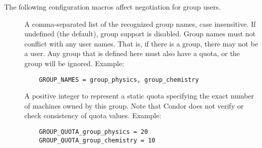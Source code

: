 The following configuration macros affect negotiation for group users.
\begin{description}

\item[] \label{param:GroupNames}
  A comma-separated list of the recognized group names, case insensitive.
  If undefined (the default), group support is disabled.
  Group names must not conflict with any user names.
  That is, if there is a \verb@physics@ group, there may not be
  a \verb@physics@ user.
  Any group that is defined here must also have a quota,
  or the group will be ignored. Example: 
  \begin{verbatim}
    GROUP_NAMES = group_physics, group_chemistry 
  \end{verbatim}

\item[] \label{param:GroupQuotaGroupname}
  A positive integer  to represent a static quota specifying
  the exact number of machines owned by this group.
  Note that Condor does not verify or check consistency of quota values.
  Example:
  \begin{verbatim}
    GROUP_QUOTA_group_physics = 20
    GROUP_QUOTA_group_chemistry = 10
  \end{verbatim}

%



\end{description}
